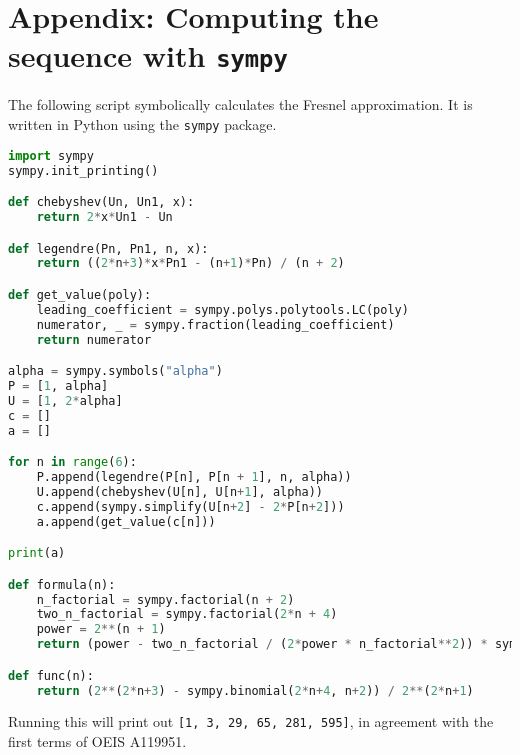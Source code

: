 \documentclass{article}
\theoremstyle{plain}
\begin{document}
    \section{Appendix: Computing the sequence with \texttt{sympy}}
        The following script symbolically calculates the Fresnel approximation.
        It is written in Python using the \texttt{sympy} package.
        \begin{lstlisting}[language = Python]
import sympy
sympy.init_printing()

def chebyshev(Un, Un1, x):
    return 2*x*Un1 - Un

def legendre(Pn, Pn1, n, x):
    return ((2*n+3)*x*Pn1 - (n+1)*Pn) / (n + 2)

def get_value(poly):
    leading_coefficient = sympy.polys.polytools.LC(poly)
    numerator, _ = sympy.fraction(leading_coefficient)
    return numerator

alpha = sympy.symbols("alpha")
P = [1, alpha]
U = [1, 2*alpha]
c = []
a = []

for n in range(6):
    P.append(legendre(P[n], P[n + 1], n, alpha))
    U.append(chebyshev(U[n], U[n+1], alpha))
    c.append(sympy.simplify(U[n+2] - 2*P[n+2]))
    a.append(get_value(c[n]))

print(a)

def formula(n):
    n_factorial = sympy.factorial(n + 2)
    two_n_factorial = sympy.factorial(2*n + 4)
    power = 2**(n + 1)
    return (power - two_n_factorial / (2*power * n_factorial**2)) * sympy.gcd(n_factorial, 2*power)

def func(n):
    return (2**(2*n+3) - sympy.binomial(2*n+4, n+2)) / 2**(2*n+1)


        \end{lstlisting}
        Running this will print out \texttt{[1, 3, 29, 65, 281, 595]},
        in agreement with the first terms of OEIS A119951.
\end{document}
